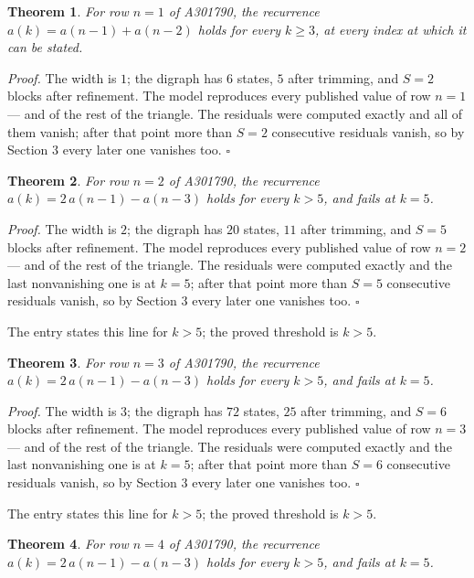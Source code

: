 \documentclass[11pt]{article}
\newtheorem{theorem}{Theorem}
\theoremstyle{definition}
\begin{document}
\begin{theorem} For row $n = 1$ of A301790, the recurrence $a(k) = a(n-1) + a(n-2)$ holds for every $k \ge 3$, at every index at which it can be stated.\end{theorem}

{\itshape Proof.} The width is $1$; the digraph has $6$ states, $5$ after trimming, and $S = 2$ blocks after refinement. The model reproduces every published value of row $n = 1$ --- and of the rest of the triangle. The residuals were computed exactly and all of them vanish; after that point more than $S = 2$ consecutive residuals vanish, so by Section 3 every later one vanishes too. $\square$

\begin{theorem} For row $n = 2$ of A301790, the recurrence $a(k) = 2\,a(n-1) - a(n-3)$ holds for every $k > 5$, and fails at $k = 5$.\end{theorem}

{\itshape Proof.} The width is $2$; the digraph has $20$ states, $11$ after trimming, and $S = 5$ blocks after refinement. The model reproduces every published value of row $n = 2$ --- and of the rest of the triangle. The residuals were computed exactly and the last nonvanishing one is at $k = 5$; after that point more than $S = 5$ consecutive residuals vanish, so by Section 3 every later one vanishes too. $\square$

The entry states this line for $k > 5$; the proved threshold is $k > 5$.

\begin{theorem} For row $n = 3$ of A301790, the recurrence $a(k) = 2\,a(n-1) - a(n-3)$ holds for every $k > 5$, and fails at $k = 5$.\end{theorem}

{\itshape Proof.} The width is $3$; the digraph has $72$ states, $25$ after trimming, and $S = 6$ blocks after refinement. The model reproduces every published value of row $n = 3$ --- and of the rest of the triangle. The residuals were computed exactly and the last nonvanishing one is at $k = 5$; after that point more than $S = 6$ consecutive residuals vanish, so by Section 3 every later one vanishes too. $\square$

The entry states this line for $k > 5$; the proved threshold is $k > 5$.

\begin{theorem} For row $n = 4$ of A301790, the recurrence $a(k) = 2\,a(n-1) - a(n-3)$ holds for every $k > 5$, and fails at $k = 5$.\end{theorem}
\end{document}
